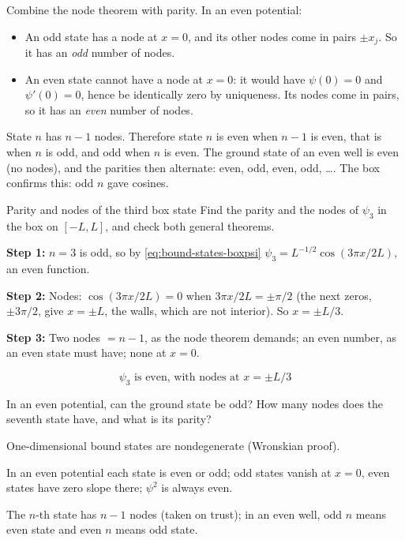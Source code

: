 Combine the node theorem with parity. In an even potential:
\begin{itemize}
\item An odd state has a node at $x=0$, and its other nodes come in pairs $\pm x_j$. So it has an \emph{odd} number of nodes.
\item An even state cannot have a node at $x=0$: it would have $\psi(0)=0$ and $\psi'(0)=0$, hence be identically zero by uniqueness. Its nodes come in pairs, so it has an \emph{even} number of nodes.
\end{itemize}
State $n$ has $n-1$ nodes. Therefore state $n$ is even when $n-1$ is even, that is when $n$ is odd, and odd when $n$ is even. The ground state of an even well is even (no nodes), and the parities then alternate: even, odd, even, odd, \dots. The box confirms this: odd $n$ gave cosines.

\begin{sample}{Parity and nodes of the third box state}
Find the parity and the nodes of $\psi_3$ in the box on $[-L,L]$, and check both general theorems.

\textbf{Step 1:} $n=3$ is odd, so by \cref{eq:bound-states-boxpsi} $\psi_3=L^{-1/2}\cos(3\pi x/2L)$, an even function.

\textbf{Step 2:} Nodes: $\cos(3\pi x/2L)=0$ when $3\pi x/2L=\pm\pi/2$ (the next zeros, $\pm3\pi/2$, give $x=\pm L$, the walls, which are not interior). So $x=\pm L/3$.

\textbf{Step 3:} Two nodes $=n-1$, as the node theorem demands; an even number, as an even state must have; none at $x=0$.

\[
\boxed{\psi_3 \text{ is even, with nodes at } x=\pm L/3}
\]
\end{sample}

\begin{checkpoint}
In an even potential, can the ground state be odd? How many nodes does the seventh state have, and what is its parity?
\end{checkpoint}

\begin{keyideas}
\item One-dimensional bound states are nondegenerate (Wronskian proof).
\item In an even potential each state is even or odd; odd states vanish at $x=0$, even states have zero slope there; $\psi^2$ is always even.
\item The $n$-th state has $n-1$ nodes (taken on trust); in an even well, odd $n$ means even state and even $n$ means odd state.
\end{keyideas}

